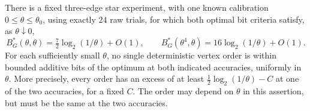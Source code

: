 \begin{corollary}\label{cor:v25-star}
There is a fixed three-edge star experiment, with one known calibration
$0\le\theta\le\theta_0$, using exactly $24$ raw trials, for which
both optimal bit criteria satisfy, as $\theta\downarrow0$,
\begin{equation}\label{eq:v25-star-bits}
 B_G^*(\theta,\theta)=\tfrac72\log_2(1/\theta)+O(1),\qquad
 B_G^*(\theta^4,\theta)=16\log_2(1/\theta)+O(1).
\end{equation}
For each sufficiently small $\theta$, no single deterministic vertex
order is within bounded additive bits of the optimum at both indicated
accuracies, uniformly in $\theta$. More precisely, every order has an
excess of at least $\tfrac12\log_2(1/\theta)-C$ at one of the two
accuracies, for a fixed $C$. The order may depend on $\theta$ in this
assertion, but must be the same at the two accuracies.
\end{corollary}
